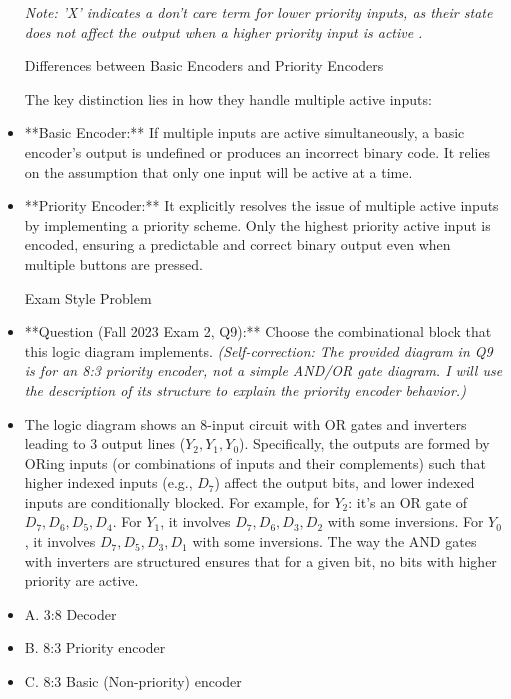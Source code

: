 \documentclass{article}
\begin{document}
\begin{itemize}
\begin{tabular}{|ccccccccc|cccc|}
\end{tabular}

 \textit{Note: 'X' indicates a don't care term for lower priority inputs, as their state does not affect the output when a higher priority input is active} \textit{.}

Differences between Basic Encoders and Priority Encoders

The key distinction lies in how they handle multiple active inputs:

\item **Basic Encoder:** If multiple inputs are active simultaneously, a basic encoder's output is undefined or produces an incorrect binary code. It relies on the assumption that only one input will be active at a time.

\item **Priority Encoder:** It explicitly resolves the issue of multiple active inputs by implementing a priority scheme. Only the highest priority active input is encoded, ensuring a predictable and correct binary output even when multiple buttons are pressed.

Exam Style Problem

\item **Question (Fall 2023 Exam 2, Q9):** Choose the combinational block that this logic diagram implements.  \textit{(Self-correction: The provided diagram in Q9 is for an 8:3 priority encoder, not a simple AND/OR gate diagram. I will use the description of its structure to explain the priority encoder behavior.)}

\item The logic diagram shows an 8-input circuit with OR gates and inverters leading to 3 output lines ($Y_2, Y_1, Y_0$). Specifically, the outputs are formed by ORing inputs (or combinations of inputs and their complements) such that higher indexed inputs (e.g., $D_7$) affect the output bits, and lower indexed inputs are conditionally blocked. For example, for $Y_2$: it's an OR gate of $D_7, D_6, D_5, D_4$. For $Y_1$, it involves $D_7, D_6, D_3, D_2$ with some inversions. For $Y_0$, it involves $D_7, D_5, D_3, D_1$ with some inversions. The way the AND gates with inverters are structured ensures that for a given bit, no bits with higher priority are active.

    \item A. 3:8 Decoder

    \item B. 8:3 Priority encoder

    \item C. 8:3 Basic (Non-priority) encoder


\end{itemize}
\end{document}
